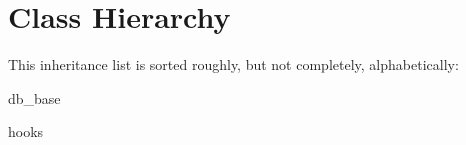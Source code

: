\section{Class Hierarchy}
This inheritance list is sorted roughly, but not completely, alphabetically\+:\begin{DoxyCompactList}
\item db\+\_\+base\begin{DoxyCompactList}
\item {}
\begin{DoxyCompactList}
\item {}
\begin{DoxyCompactList}
\item {}
\end{DoxyCompactList}
\end{DoxyCompactList}
\item {}
\end{DoxyCompactList}
\item hooks\begin{DoxyCompactList}
\item {}
\end{DoxyCompactList}
\item {}
\item {}
\end{DoxyCompactList}
